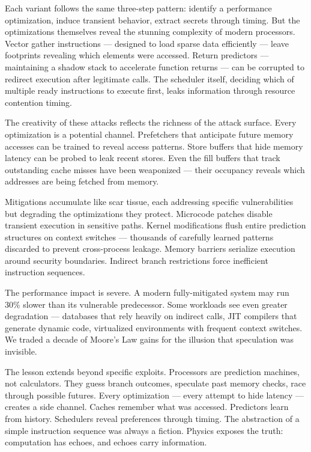 Each variant follows the same three-step pattern: identify a performance optimization, induce transient behavior, extract secrets through timing. But the optimizations themselves reveal the stunning complexity of modern processors. Vector gather instructions — designed to load sparse data efficiently — leave footprints revealing which elements were accessed. Return predictors — maintaining a shadow stack to accelerate function returns — can be corrupted to redirect execution after legitimate calls. The scheduler itself, deciding which of multiple ready instructions to execute first, leaks information through resource contention timing.

The creativity of these attacks reflects the richness of the attack surface. Every optimization is a potential channel. Prefetchers that anticipate future memory accesses can be trained to reveal access patterns. Store buffers that hide memory latency can be probed to leak recent stores. Even the fill buffers that track outstanding cache misses have been weaponized — their occupancy reveals which addresses are being fetched from memory.

Mitigations accumulate like scar tissue, each addressing specific vulnerabilities but degrading the optimizations they protect. Microcode patches disable transient execution in sensitive paths. Kernel modifications flush entire prediction structures on context switches — thousands of carefully learned patterns discarded to prevent cross-process leakage. Memory barriers serialize execution around security boundaries. Indirect branch restrictions force inefficient instruction sequences.

The performance impact is severe. A modern fully-mitigated system may run 30\% slower than its vulnerable predecessor. Some workloads see even greater degradation — databases that rely heavily on indirect calls, JIT compilers that generate dynamic code, virtualized environments with frequent context switches. We traded a decade of Moore's Law gains for the illusion that speculation was invisible.

The lesson extends beyond specific exploits. Processors are prediction machines, not calculators. They guess branch outcomes, speculate past memory checks, race through possible futures. Every optimization — every attempt to hide latency — creates a side channel. Caches remember what was accessed. Predictors learn from history. Schedulers reveal preferences through timing. The abstraction of a simple instruction sequence was always a fiction. Physics exposes the truth: computation has echoes, and echoes carry information.
